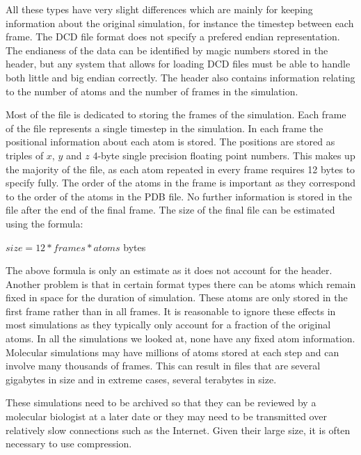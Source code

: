 \documentclass[a4paper,11pt]{report}
\begin{document}
All these types have very slight differences which are mainly for keeping information about the original simulation, for instance the timestep between each frame. The DCD file format does not specify a prefered endian representation. The endianess of the data can be identified by magic numbers stored in the header, but any system that allows for loading DCD files must be able to handle both little and big endian correctly. The header also contains information relating to the number of atoms and the number of frames in the simulation.

Most of the file is dedicated to storing the frames of the simulation. Each frame of the file represents a single timestep in the simulation. In each frame the positional information about each atom is stored. The positions are stored as triples of $x$, $y$ and $z$ 4-byte single precision floating point numbers. This makes up the majority of the file, as each atom repeated in every frame requires 12 bytes to specify fully. The order of the atoms in the frame is important as they correspond to the order of the atoms in the PDB file. No further information is stored in the file after the end of the final frame. The size of the final file can be estimated using the formula: 

\begin{center} $size = 12*frames*atoms$ bytes\end{center}

The above formula is only an estimate as it does not account for the header. Another problem is that in certain format types there can be atoms which remain fixed in space for the duration of simulation. These atoms are only stored in the first frame rather than in all frames. It is reasonable to ignore these effects in most simulations as they typically only account for a fraction of the original atoms. In all the simulations we looked at, none have any fixed atom information. Molecular simulations may have millions of atoms stored at each step and can involve many thousands of frames. This can result in files that are several gigabytes in size and in extreme cases, several terabytes in size.

These simulations need to be archived so that they can be reviewed by a molecular biologist at a later date or they may need to be transmitted over relatively slow connections such as the Internet. Given their large size, it is often necessary to use compression.
\end{document}
